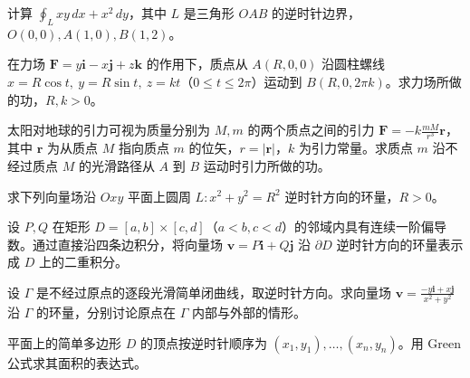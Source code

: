 \newpage
\noindent\begin{minipage}{\textwidth}
计算 $\oint_Lxy\,dx+x^2\,dy$，其中 $L$ 是三角形 $OAB$ 的逆时针边界，$O(0,0),A(1,0),B(1,2)$。
\end{minipage}\par\vfill
\noindent\begin{minipage}{\textwidth}
在力场 $\boldsymbol F=y\boldsymbol i-x\boldsymbol j+z\boldsymbol k$ 的作用下，质点从 $A(R,0,0)$ 沿圆柱螺线 $x=R\cos t,\ y=R\sin t,\ z=kt$（$0\le t\le2\pi$）运动到 $B(R,0,2\pi k)$。求力场所做的功，$R,k>0$。
\end{minipage}\par\vfill
\noindent\begin{minipage}{\textwidth}
太阳对地球的引力可视为质量分别为 $M,m$ 的两个质点之间的引力 $\boldsymbol F=-k\frac{mM}{r^3}\boldsymbol r$，其中 $\boldsymbol r$ 为从质点 $M$ 指向质点 $m$ 的位矢，$r=|\boldsymbol r|$，$k$ 为引力常量。求质点 $m$ 沿不经过质点 $M$ 的光滑路径从 $A$ 到 $B$ 运动时引力所做的功。
\end{minipage}\par\vfill
\noindent\begin{minipage}{\textwidth}
求下列向量场沿 $Oxy$ 平面上圆周 $L:x^2+y^2=R^2$ 逆时针方向的环量，$R>0$。
\end{minipage}\par\vfill
\newpage
\noindent\begin{minipage}{\textwidth}
设 $P,Q$ 在矩形 $D=[a,b]\times[c,d]$（$a<b,c<d$）的邻域内具有连续一阶偏导数。通过直接沿四条边积分，将向量场 $\boldsymbol v=P\boldsymbol i+Q\boldsymbol j$ 沿 $\partial D$ 逆时针方向的环量表示成 $D$ 上的二重积分。
\end{minipage}\par\vfill
\noindent\begin{minipage}{\textwidth}
设 $\Gamma$ 是不经过原点的逐段光滑简单闭曲线，取逆时针方向。求向量场 $\boldsymbol v=\frac{-y\boldsymbol i+x\boldsymbol j}{x^2+y^2}$ 沿 $\Gamma$ 的环量，分别讨论原点在 $\Gamma$ 内部与外部的情形。
\end{minipage}\par\vfill
\noindent\begin{minipage}{\textwidth}
平面上的简单多边形 $D$ 的顶点按逆时针顺序为 $(x_1,y_1),\ldots,(x_n,y_n)$。用 Green 公式求其面积的表达式。
\end{minipage}\par\vfill

